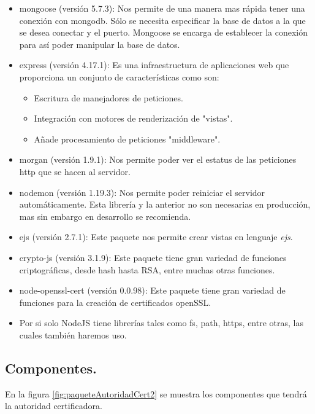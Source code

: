\documentclass[12pt, a4paper, titlepage]{report}
\begin{document}
            \begin{itemize}
                \item mongoose (versión 5.7.3): Nos permite de una manera mas rápida tener una conexión con mongodb. Sólo se necesita especificar la base de datos a la que se desea conectar y el puerto. Mongoose se encarga de establecer la conexión para así poder manipular la base de datos.
                \item express (versión 4.17.1): Es una infraestructura de aplicaciones web que proporciona un conjunto de características como son: 
                    \begin{itemize}
                        \item Escritura de manejadores de peticiones.
                        \item Integración con motores de renderización de "vistas".
                        \item Añade procesamiento de peticiones "middleware".
                    \end{itemize}
                \item morgan (versión 1.9.1): Nos permite poder ver el estatus de las peticiones http que se hacen al servidor. 
                \item nodemon (versión 1.19.3): Nos permite poder reiniciar el servidor automáticamente. Esta librería y la anterior no son necesarias en producción, mas sin embargo en desarrollo se recomienda.
                \item ejs (versión 2.7.1): Este paquete nos permite crear vistas en lenguaje \textit{ejs}. 
                \item crypto-js (versión 3.1.9): Este paquete tiene gran variedad de funciones criptográficas, desde hash hasta RSA, entre muchas otras funciones.
                \item node-openssl-cert (versión 0.0.98): Este paquete tiene gran variedad de funciones para la creación de certificados openSSL. 
                \item Por si solo NodeJS tiene librerías tales como fs, path, https, entre otras, las cuales también haremos uso.
            \end{itemize}
	        
        \subsection{Componentes.}
	        
	        En la figura \ref{fig:paqueteAutoridadCert2} se muestra los componentes que tendrá la autoridad certificadora.
	        
\end{document}
